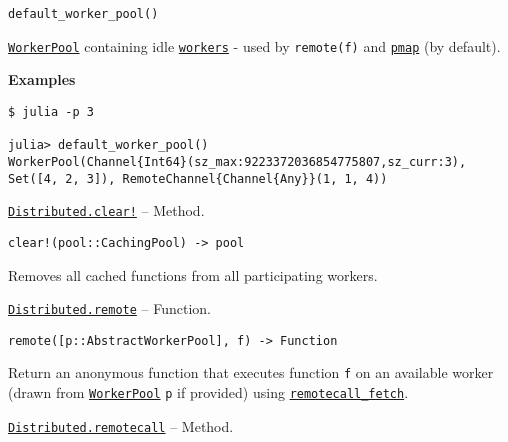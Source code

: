 \begin{adjustwidth}{2em}{0pt}


\begin{verbatim}
default_worker_pool()
\end{verbatim}

\hyperlink{17976394752057970100}{\texttt{WorkerPool}} containing idle \hyperlink{7474509137601932173}{\texttt{workers}} - used by \texttt{remote(f)} and \hyperlink{9432281416771383761}{\texttt{pmap}} (by default).

\textbf{Examples}


\begin{verbatim}
$ julia -p 3

julia> default_worker_pool()
WorkerPool(Channel{Int64}(sz_max:9223372036854775807,sz_curr:3), Set([4, 2, 3]), RemoteChannel{Channel{Any}}(1, 1, 4))
\end{verbatim}



\end{adjustwidth}
\hypertarget{16881245113854963094}{} 
\hyperlink{16881245113854963094}{\texttt{Distributed.clear!}}  -- {Method.}

\begin{adjustwidth}{2em}{0pt}


\begin{verbatim}
clear!(pool::CachingPool) -> pool
\end{verbatim}

Removes all cached functions from all participating workers.



\end{adjustwidth}
\hypertarget{11837735656545549689}{} 
\hyperlink{11837735656545549689}{\texttt{Distributed.remote}}  -- {Function.}

\begin{adjustwidth}{2em}{0pt}


\begin{verbatim}
remote([p::AbstractWorkerPool], f) -> Function
\end{verbatim}

Return an anonymous function that executes function \texttt{f} on an available worker (drawn from \hyperlink{17976394752057970100}{\texttt{WorkerPool}} \texttt{p} if provided) using \hyperlink{14909184572421937971}{\texttt{remotecall\_fetch}}.



\end{adjustwidth}
\hypertarget{13826444473261744969}{} 
\hyperlink{13826444473261744969}{\texttt{Distributed.remotecall}}  -- {Method.}

